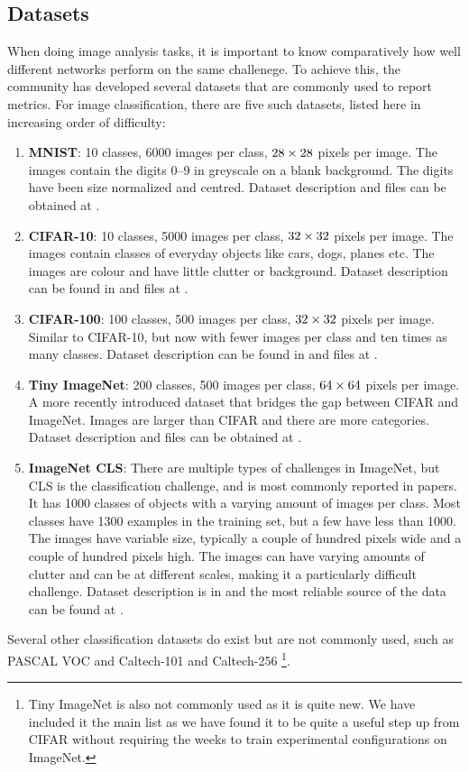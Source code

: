\subsection{Datasets}
When doing image analysis tasks, it is important to know comparatively how well
different networks perform on the same challenege. To achieve this, the
community has developed several datasets that are commonly used to report
metrics. For image classification, there are five such datasets, listed here in
increasing order of difficulty:
\begin{enumerate}
  \item \textbf{MNIST}: 10 classes, 6000 images per class, $28\times 28$ pixels per image. 
    The images contain the digits 0--9 in greyscale on a blank background. The
    digits have been size normalized and centred. Dataset description and files can be obtained 
    at \cite{lecun_modified_1998}.
  \item \textbf{CIFAR-10}: 10 classes, 5000 images per class, $32\times 32$ pixels per image.
    The images contain classes of everyday objects like cars, dogs, planes etc.
    The images are colour and have little clutter or background. Dataset
    description can be found in \cite{krizhevsky_learning_2009} and files at
    \cite{krizhevsky_cifar_2009}.
  \item \textbf{CIFAR-100}: 100 classes, 500 images per class, $32\times 32$ pixels per image. 
    Similar to CIFAR-10, but now with fewer images per class and ten times as
    many classes. Dataset description can be found in
    \cite{krizhevsky_learning_2009} and files at \cite{krizhevsky_cifar_2009}.
  \item \textbf{Tiny ImageNet}: 200 classes, 500 images per class, 
    $64 \times 64$ pixels per image. A more recently introduced dataset that bridges
    the gap between CIFAR and ImageNet. Images are larger than CIFAR and there
    are more categories. Dataset description and files can be obtained at \cite{li_tiny_2017}.
  \item \textbf{ImageNet CLS}: There are multiple types of challenges in ImageNet, but CLS
    is the classification challenge, and is most commonly reported in papers. 
    It has 1000 classes of objects with a varying amount of images per class.
    Most classes have 1300 examples in the training set, but a few have less
    than 1000. The images have variable size, typically a couple of hundred
    pixels wide and a couple of hundred pixels high. The images can have varying
    amounts of clutter and can be at different scales, making it a particularly
    difficult challenge. Dataset description is in
    \cite{russakovsky_imagenet_2014} and the most reliable source of the data
    can be found at \cite{stanford_vision_lab_imagenet_2017}.
\end{enumerate}
Several other classification datasets do exist but are not commonly used, such
as PASCAL VOC \cite{Everingham15} and Caltech-101 and Caltech-256
\cite{li_fei-fei_learning_2004}\footnote{Tiny ImageNet is also not commonly 
used as it is quite new. We have included it the main list as we have found it 
to be quite a useful step up from CIFAR without requiring the weeks to train
experimental configurations on ImageNet.}.

